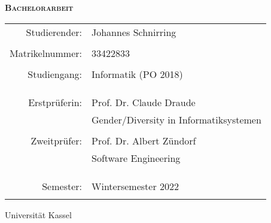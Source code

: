 \begin{titlepage}
    \centering
    {\scshape\Huge \thesisTitle \par}
    \vspace{1cm}
    {\scshape\Large \textbf{Bachelorarbeit}\par}
    \vspace{1.5cm}
    \begin{tabular}{r l}
        {\Large Studierender:}   & {\Large Johannes Schnirring}                     \\ \\
        {\Large Matrikelnummer:} & {\Large 33422833}                                \\ \\
        {\Large Studiengang:}    & {\Large Informatik (PO 2018) }                   \\ \\ \\ \\
        {\Large Erstprüferin:}   & {\Large Prof. Dr. Claude Draude }                \\
                                 & {\Large Gender/Diversity in Informatiksystemen } \\ \\
        {\Large Zweitprüfer:}    & {\Large Prof. Dr. Albert Zündorf }               \\
                                 & {\Large Software Engineering }                   \\ \\ \\ \\
        {\Large Semester:}       & {\Large Wintersemester 2022}                     \\ \\
    \end{tabular}
    \vfill
    {\large Universität Kassel}
\end{titlepage}